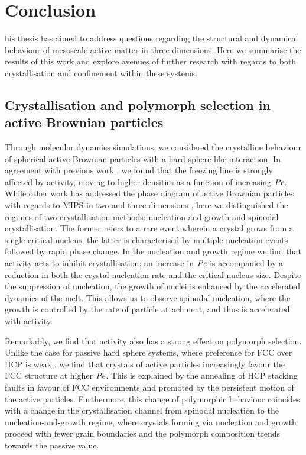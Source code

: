 
\let\textcircled=\pgftextcircled
\chapter{Conclusion}
\label{chap:conclusion}

his thesis has aimed to address questions regarding the structural and dynamical behaviour of mesoscale active matter in three-dimensions. Here we summarise the results of this work and explore avenues of further research with regards to both crystallisation and confinement within these systems.

\section{Crystallisation and polymorph selection in active Brownian particles}

Through molecular dynamics simulations, we considered the crystalline behaviour of spherical active Brownian particles with a hard sphere like interaction. In agreement with previous work \cite{wysocki2014,omar2021a}, we found that the freezing line is strongly affected by activity, moving to higher densities as a function of increasing $\operatorname{\mathit{P\kern-.08em e}}$. While other work has addressed the phase diagram of active Brownian particles with regards to MIPS in two and three dimensions \cite{digregorio2018,omar2021a}, here we distinguished the regimes of two crystallisation methods: nucleation and growth and spinodal crystallisation. The former refers to a rare event wherein a crystal grows from a single critical nucleus, the latter is characterised by multiple nucleation events followed by rapid phase change.
In the nucleation and growth regime we find that activity acts to inhibit crystallisation: an increase in $\operatorname{\mathit{P\kern-.08em e}}$ is accompanied by a reduction in both the crystal nucleation rate and the critical nucleus size. Despite the suppression of nucleation, the growth of nuclei is enhanced by the accelerated dynamics of the melt. This allows us to observe spinodal nucleation, where the growth is controlled by the rate of particle attachment, and thus is accelerated with activity.

Remarkably, we find that activity also has a strong effect on polymorph selection. Unlike the case for passive hard sphere systems, where preference for FCC over HCP is weak \cite{woodcock1997,pronk1999}, we find that crystals of active particles increasingly favour the FCC structure at higher $\operatorname{\mathit{P\kern-.08em e}}$. This is explained by the annealing of HCP stacking faults in favour of FCC environments and promoted by the persistent motion of the active particles. Furthermore, this change of polymorphic behaviour coincides with a change in the crystallisation channel from spinodal nucleation to the nucleation-and-growth regime, where crystals forming via nucleation and growth proceed with fewer grain boundaries and the polymorph composition trends towards the passive value.

